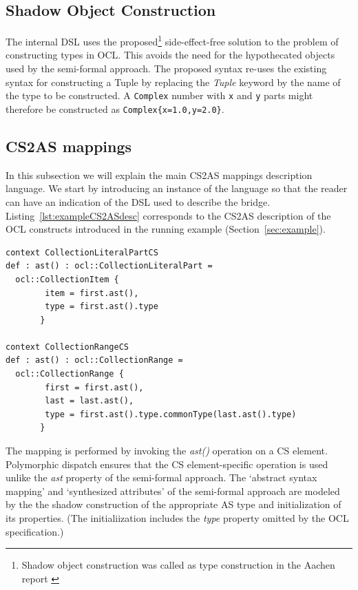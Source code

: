 \documentclass{llncs}
\begin{document}
\subsection{Shadow Object Construction}
\label{subsec:ShadowExp}

The internal DSL uses the proposed\footnote{Shadow object construction was called as type construction in the Aachen report \cite{brucker2013aachenReport}} side-effect-free solution to the problem of constructing types in OCL. This avoids the need for the hypothecated objects used by the semi-formal approach. The proposed syntax re-uses the existing syntax for constructing a Tuple by replacing the \emph{Tuple} keyword by the name of the type to be constructed. A \verb$Complex$ number with \verb$x$ and \verb$y$ parts might therefore be constructed as \verb$Complex{x=1.0,y=2.0}$. %

\subsection{CS2AS mappings}
\label{subsec:mappings}

In this subsection we will explain the main CS2AS mappings description language. We start by introducing an instance of the language so that the reader can have an indication of the DSL used to describe the bridge. Listing~\ref{lst:exampleCS2ASdesc} corresponds to the CS2AS description of the OCL constructs introduced in the running example (Section~\ref{sec:example}).

\begin{lstlisting}[caption=CS2AS description for running example, label=lst:exampleCS2ASdesc, language=OCL]
context CollectionLiteralPartCS	
def : ast() : ocl::CollectionLiteralPart = 
  ocl::CollectionItem {
        item = first.ast(),	
        type = first.ast().type
       }
  
context CollectionRangeCS	
def : ast() : ocl::CollectionRange = 
  ocl::CollectionRange {
        first = first.ast(),
        last = last.ast(),
        type = first.ast().type.commonType(last.ast().type)
       }
\end{lstlisting}

The mapping is performed by invoking the \emph{ast()} operation on a CS element. Polymorphic dispatch ensures that the CS element-specific operation is used unlike the \emph{ast} property of the semi-formal approach. The `abstract syntax mapping' and `synthesized attributes' of the semi-formal approach are modeled by the the shadow construction of the appropriate AS type and initialization of its properties. (The initialiization includes the \emph{type} property omitted by the OCL specification.)
\end{document}
